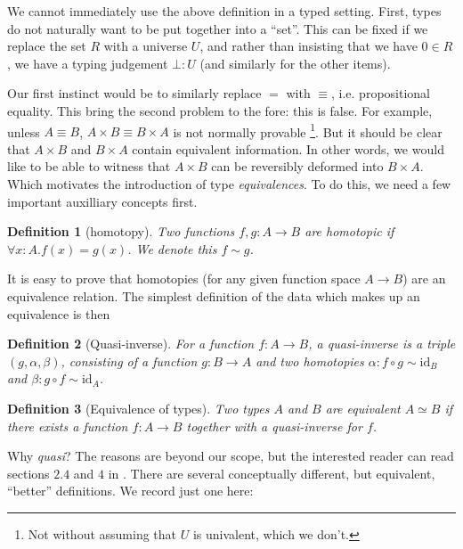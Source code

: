 \documentclass{article}
\newtheorem{defn}{Definition}[section]
\begin{document}
We cannot immediately use the above definition in a typed setting.
First, types do not naturally want to be put together into a ``set''.
This can be fixed if we replace the set $R$ with a universe $U$, and
rather than insisting that we have $0 \in R$, we have a typing
judgement $\bot : U$ (and similarly for the other items).

Our first instinct would be to similarly replace $=$ with
$\equiv$, i.e. propositional equality. This bring the second
problem to the fore: this is false. For example, unless $A \equiv B$,
$A \times B \equiv B \times A$ is not normally provable%
\footnote{Not without assuming that $U$ is univalent, which we
don't.}. But it should be clear that $A \times B$ and $B \times A$
contain equivalent information. In other words, we would like to
be able to witness that $A \times B$ can be reversibly deformed
into $B \times A$. Which motivates the introduction of 
type \emph{equivalences}. To do this, we need a few important
auxilliary concepts first.

\begin{defn}[homotopy]
\label{def:homotopy}
Two functions $f,g:A \rightarrow B$ are \emph{homotopic} if
$\forall x:A. f(x) = g(x)$. We denote this $f \sim g$.
\end{defn}

\noindent It is easy to prove that homotopies (for any given function
space $A \rightarrow B$) are an equivalence relation.  The simplest
definition of the data which makes up an equivalence is then

\begin{defn}[Quasi-inverse]
\label{def:quasi}
For a function $f : A \rightarrow B$, a \emph{quasi-inverse} is a
triple $(g, \alpha, \beta)$, consisting of a function
$g : B \rightarrow A$ and two homotopies
$\alpha : f \circ g \sim \mathrm{id}_B$ and
$\beta : g \circ f \sim \mathrm{id}_A$.
\end{defn}
 
\begin{defn}[Equivalence of types]
  Two types $A$ and $B$ are equivalent $A \simeq B$ if there exists a
  function $f : A \rightarrow B$ together with a quasi-inverse for $f$.
\end{defn}

\noindent Why \emph{quasi}? The reasons are beyond our scope, but
the interested reader can read sections $2.4$ and $4$ in \cite{hott-book}.
There are several conceptually different, but equivalent, 
``better'' definitions.  We record just one here:
\end{document}
